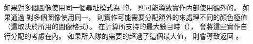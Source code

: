 如果對多個圖像使用同一個尋址模式為  的，
則可能導致實作內部使用額外的。
如果通過  對多個圖像使用同一，
則實作可能需要分配額外的來處理不同的顏色極值（這取決於所用的圖像格式）。
在計算所支持的最大數目時（），
會將這些實作自行分配的考慮在內。
如果所入隊的需要的超過了這個最大值，
則會導致返回 。
